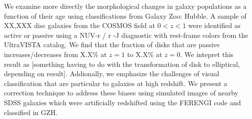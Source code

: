 We examine more directly the morphological changes in galaxy populations as a function of their age using classifications from Galaxy Zoo: Hubble. A sample of XX,XXX disc galaxies from the COSMOS field at $0<z<1$ were identified as active or passive using a NUV-r / r -J diagnostic with rest-frame colors from the UltraVISTA catalog. We find that the fraction of disks that are passive increases/decreases from X.X\% at $z=1$ to X.X\% at $z=0$. We intepret this result as [something having to do with the transformation of disk to elliptical, depending on result]. Addionally, we emphasize the challenges of visual classification that are particular to galaxies at high redshift. We present a correction technique to address these biases using simulated images of nearby SDSS galaxies which were artificially redshifted using the FERENGI code and classified in GZH.  








